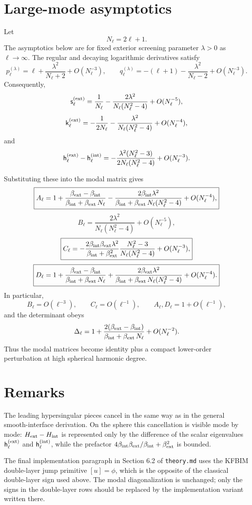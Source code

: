 \documentclass[11pt]{article}
\newcommand{\bi}{\beta_{\rm int}}
\newcommand{\be}{\beta_{\rm ext}}
\newcommand{\bsum}{\beta_{\rm int}+\beta_{\rm ext}}
\begin{document}
\section*{Large-mode asymptotics}

Let
\[
    N_\ell=2\ell+1.
\]
The asymptotics below are for fixed exterior screening parameter
$\lambda>0$ as $\ell\to\infty$.  The regular and decaying logarithmic
derivatives satisfy
\[
    p_\ell^{(\lambda)}
    =
    \ell+\frac{\lambda^2}{N_\ell+2}+O(N_\ell^{-3}),
    \qquad
    q_\ell^{(\lambda)}
    =
    -(\ell+1)-\frac{\lambda^2}{N_\ell-2}
    +O(N_\ell^{-3}).
\]
Consequently,
\[
    \mathsf{s}_\ell^{({\rm ext})}
    =
    \frac{1}{N_\ell}
    -
    \frac{2\lambda^2}{N_\ell(N_\ell^2-4)}
    +O(N_\ell^{-5}),
\]
\[
    \mathsf{k}_\ell^{({\rm ext})}
    =
    -\frac{1}{2N_\ell}
    -
    \frac{\lambda^2}{N_\ell(N_\ell^2-4)}
    +O(N_\ell^{-4}),
\]
and
\[
    \mathsf{h}_\ell^{({\rm ext})}
    -
    \mathsf{h}_\ell^{({\rm int})}
    =
    -\frac{\lambda^2(N_\ell^2-3)}
           {2N_\ell(N_\ell^2-4)}
    +O(N_\ell^{-3}).
\]

Substituting these into the modal matrix gives
\[
    \boxed{
    A_\ell
    =
    1
    +
    \frac{\be-\bi}{\bsum\,N_\ell}
    -
    \frac{2\bi\lambda^2}
         {\bsum\,N_\ell(N_\ell^2-4)}
    +O(N_\ell^{-4}),
    }
\]
\[
    \boxed{
    B_\ell
    =
    \frac{2\lambda^2}
         {N_\ell(N_\ell^2-4)}
    +O(N_\ell^{-5}),
    }
\]
\[
    \boxed{
    C_\ell
    =
    -
    \frac{2\bi\be\lambda^2}{\bsum^2}
    \frac{N_\ell^2-3}{N_\ell(N_\ell^2-4)}
    +O(N_\ell^{-3}),
    }
\]
\[
    \boxed{
    D_\ell
    =
    1
    +
    \frac{\be-\bi}{\bsum\,N_\ell}
    +
    \frac{2\be\lambda^2}
         {\bsum\,N_\ell(N_\ell^2-4)}
    +O(N_\ell^{-4}).
    }
\]
In particular,
\[
    B_\ell=O(\ell^{-3}),
    \qquad
    C_\ell=O(\ell^{-1}),
    \qquad
    A_\ell,D_\ell=1+O(\ell^{-1}),
\]
and the determinant obeys
\[
    \Delta_\ell
    =
    1
    +
    \frac{2(\be-\bi)}{\bsum\,N_\ell}
    +O(N_\ell^{-2}).
\]
Thus the modal matrices become identity plus a compact lower-order
perturbation at high spherical harmonic degree.

\section*{Remarks}

The leading hypersingular pieces cancel in the same way as in the general
smooth-interface derivation.  On the sphere this cancellation is visible mode
by mode: $H_{\rm ext}-H_{\rm int}$ is represented only by the difference of
the scalar eigenvalues $\mathsf{h}_\ell^{({\rm ext})}$ and
$\mathsf{h}_\ell^{({\rm int})}$, while the prefactor
$4\bi\be/\bsum^2$ is bounded.

The final implementation paragraph in Section 6.2 of \texttt{theory.md} uses
the KFBIM double-layer jump primitive $[u]=\phi$, which is the opposite of the
classical double-layer sign used above.  The modal diagonalization is
unchanged; only the signs in the double-layer rows should be replaced by the
implementation variant written there.
\end{document}
